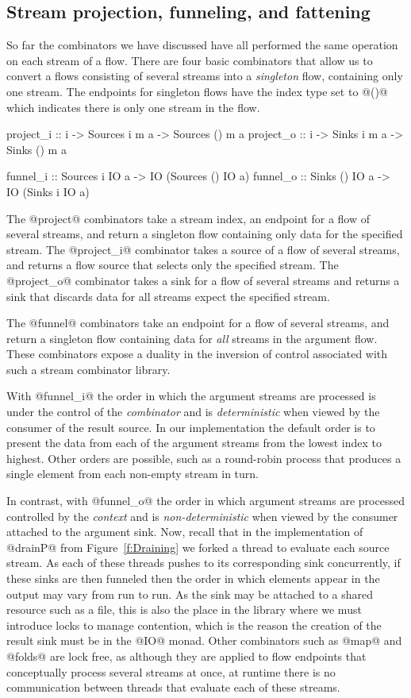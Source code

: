 \subsection{Stream projection, funneling, and fattening}
So far the combinators we have discussed have all performed the same operation on each stream of a flow. There are four basic combinators that allow us to convert a flows consisting of several streams into a \emph{singleton} flow, containing only one stream. The endpoints for singleton flows have the index type set to @()@ which indicates there is only one stream in the flow.
\begin{code}
project_i :: i -> Sources i m a -> Sources () m a
project_o :: i -> Sinks   i m a -> Sinks   () m a

funnel_i  :: Sources i IO a -> IO (Sources () IO a)
funnel_o  :: Sinks  () IO a -> IO (Sinks   i  IO a)
\end{code}

The @project@ combinators take a stream index, an endpoint for a flow of several streams, and return a singleton flow containing only data for the specified stream. The @project_i@ combinator takes a source of a flow of several streams, and returns a flow source that selects only the specified stream. The @project_o@ combinator takes a sink for a flow of several streams and returns a sink that discards data for all streams expect the specified stream.

The @funnel@ combinators take an endpoint for a flow of several streams, and return a singleton flow containing data for \emph{all} streams in the argument flow. These combinators expose a duality in the inversion of control associated with such a stream combinator library. 

With @funnel_i@ the order in which the argument streams are processed is under the control of the \emph{combinator} and is \emph{deterministic} when viewed by the consumer of the result source. In our implementation the default order is to present the data from each of the argument streams from the lowest index to highest. Other orders are possible, such as a round-robin process that produces a single element from each non-empty stream in turn. 

In contrast, with @funnel_o@ the order in which argument streams are processed controlled by the \emph{context} and is \emph{non-deterministic} when viewed by the consumer attached to the argument sink. Now, recall that in the implementation of @drainP@ from Figure~\ref{f:Draining} we forked a thread to evaluate each source stream. As each of these threads pushes to its corresponding sink concurrently, if these sinks are then funneled then the order in which elements appear in the output may vary from run to run. As the sink may be attached to a shared resource such as a file, this is also the place in the library where we must introduce locks to manage contention, which is the reason the creation of the result sink must be in the @IO@ monad. Other combinators such as @map@ and @folds@ are lock free, as although they are applied to flow endpoints that conceptually process several streams at once, at runtime there is no communication between threads that evaluate each of these streams.

